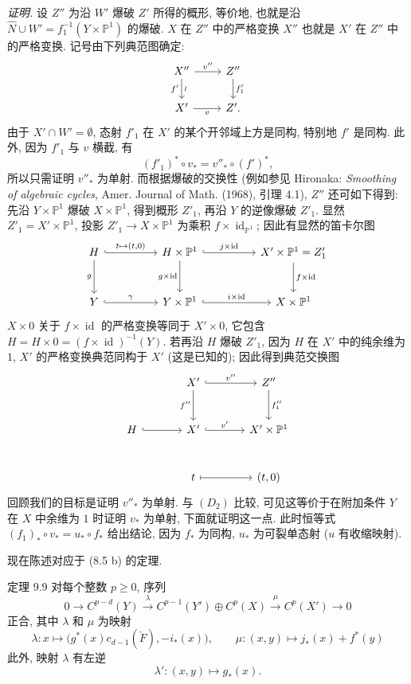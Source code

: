 \emph{证明.} 设 $Z''$ 为沿 $W'$ 爆破 $Z'$ 所得的概形, 等价地, 也就是沿 $\widehat N\cup W'=f_1^{-1}(Y\times\mathbb P^1)$ 的爆破. $X$ 在 $Z''$ 中的严格变换 $X''$ 也就是 $X'$ 在 $Z''$ 中的严格变换. 记号由下列典范图确定:
\[
\begin{tikzcd}
X''\arrow[r,"v''"]\arrow[d,"f'"',"\wr"]&Z''\arrow[d,"f'_1"]\\
X'\arrow[r,"v"']&Z'.
\end{tikzcd}
\]
由于 $X'\cap W'=\emptyset$, 态射 $f'_1$ 在 $X'$ 的某个开邻域上方是同构, 特别地 $f'$ 是同构. 此外, 因为 $f'_1$ 与 $v$ 横截, 有
\[
(f'_1)^*\circ v_*=v''_*\circ(f')^*,
\tag{9.8.8}
\]
所以只需证明 $v''_*$ 为单射. 而根据爆破的交换性 (例如参见 Hironaka: \emph{Smoothing of algebraic cycles}, Amer. Journal of Math. (1968), 引理 4.1), $Z''$ 还可如下得到: 先沿 $Y\times\mathbb P^1$ 爆破 $X\times\mathbb P^1$, 得到概形 $Z'_1$, 再沿 $Y$ 的逆像爆破 $Z'_1$. 显然 $Z'_1=X'\times\mathbb P^1$, 投影 $Z'_1\to X\times\mathbb P^1$ 为乘积 $f\times\operatorname{id}_{\mathbb P^1}$; 因此有显然的笛卡尔图
\[
\begin{tikzcd}[column sep=huge,row sep=large]
H\arrow[r,hook,"{t\mapsto(t,0)}"]\arrow[d,"g"']&H\times\mathbb P^1\arrow[r,hook,"{j\times\operatorname{id}}"]\arrow[d,"{g\times\operatorname{id}}"']&X'\times\mathbb P^1=Z'_1\arrow[d,"{f\times\operatorname{id}}"]\\
Y\arrow[r,hook,"\gamma"]&Y\times\mathbb P^1\arrow[r,hook,"{i\times\operatorname{id}}"]&X\times\mathbb P^1
\end{tikzcd}
\]
$X\times0$ 关于 $f\times\operatorname{id}$ 的严格变换等同于 $X'\times0$, 它包含 $H=H\times0=(f\times\operatorname{id})^{-1}(Y)$. 若再沿 $H$ 爆破 $Z'_1$, 因为 $H$ 在 $X'$ 中的纯余维为 $1$, $X'$ 的严格变换典范同构于 $X'$ (这是已知的); 因此得到典范交换图
\[
\begin{tikzcd}[column sep=large,row sep=large]
&X'\arrow[r,hook,"v''"]\arrow[d,"f''"']&Z''\arrow[d,"f''_1"]\\
H\arrow[r,hook]&X'\arrow[r,hook,"v'"]&X'\times\mathbb P^1\\
&t\arrow[r,mapsto]&{(t,0)}
\end{tikzcd}
\]
回顾我们的目标是证明 $v''_*$ 为单射. 与 $(D_2)$ 比较, 可见这等价于在附加条件 $Y$ 在 $X$ 中余维为 $1$ 时证明 $v_*$ 为单射, 下面就证明这一点. 此时恒等式 $(f_1)_*\circ v_*=u_*\circ f_*$ 给出结论, 因为 $f_*$ 为同构, $u_*$ 为可裂单态射 ($u$ 有收缩映射).

现在陈述对应于 (8.5 b) 的定理.

\begin{statement}{定理 9.9}
对每个整数 $p\ge0$, 序列
\[
0\to C^{p-d}(Y)\xrightarrow{\lambda} C^{p-1}(Y')\oplus C^p(X)\xrightarrow{\mu} C^p(X')\to0
\]
正合, 其中 $\lambda$ 和 $\mu$ 为映射
\[
\lambda:x\mapsto\bigl(g^*(x)c_{d-1}(\check F),-i_*(x)\bigr),
\qquad
\mu:(x,y)\mapsto j_*(x)+f^*(y)
\]
此外, 映射 $\lambda$ 有左逆
\[
\lambda':(x,y)\mapsto g_*(x).
\]
\end{statement}


